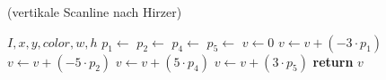 \begin{algorithm}[!ht]\small
\caption{ (vertikale Scanline nach Hirzer)}
\label{alg:convolutekernelhirzer-vertical}
\begin{algorithmic}[1]
	\Require $I,x,y,\mathit{color},w,h$
	\State $p_1 \gets$ 
	\State $p_2 \gets$ 
	\State $p_4 \gets$ 
	\State $p_5 \gets$ 
	\State $v \gets 0$
	\State $v \gets v + \left( -3 \cdot p_1 \right)$
	\State $v \gets v + \left( -5 \cdot p_2 \right)$
	\State $v \gets v + \left( 5 \cdot p_4 \right)$
	\State $v \gets v + \left( 3 \cdot p_5 \right)$
	\State \textbf{return} $v$
\end{algorithmic}
\end{algorithm}
